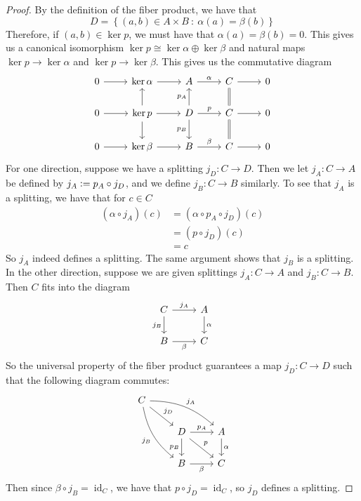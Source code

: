 \documentclass[psamsfonts, 12pt]{amsart}
\theoremstyle{definition}
\theoremstyle{remark}
\newcommand{\set}[1]{\left\lbrace #1 \right\rbrace}
\newcommand{\defeq}{\vcentcolon=}
\DeclareMathOperator{\id}{id}
\begin{document}
\begin{proof}
By the definition of the fiber product, we have that
\[
D = \set{(a,b) \in A \times B ~:~ \alpha(a) = \beta(b)}
\]
Therefore, if $(a,b) \in \ker p$, we must have that $\alpha(a) = \beta(b) = 0$.
This gives us a canonical isomorphism $\ker p \cong \ker\alpha\oplus\ker\beta$
and natural maps $\ker p \to \ker\alpha$ and $\ker p \to \ker\beta$. This
gives us the commutative diagram
\[\begin{tikzcd}
0 \ar[r] & \ker\alpha \ar[r] & A \ar[r,"\alpha"] & C \ar[d,equal] \ar[r] & 0 \\
0 \ar[r] & \ker p \ar[u]\ar[d]\ar[r] & D \ar[d, "p_B"']\ar[u, "p_A"]\ar[r,"p"]
& C \ar[r] \ar[d, equal] & 0 \\
0 \ar[r] & \ker\beta \ar[r] & B \ar[r,"\beta"] & C \ar[r] & 0
\end{tikzcd}\]
For one direction, suppose we have a splitting $j_D : C \to D$. Then we let
$j_A : C \to A$ be defined by $j_A \defeq p_A\circ j_D$, and we define $j_B : C \to B$
similarly. To see that $j_A$ is a splitting, we have that for $c \in C$
\begin{align*}
(\alpha \circ j_A)(c) &= (\alpha \circ p_A \circ j_D)(c) \\
&= (p \circ j_D)(c) \\
&= c
\end{align*}
So $j_A$ indeed defines a splitting. The same argument shows that $j_B$ is a
splitting. \\

In the other direction, suppose we are given splittings $j_A : C \to A$ and
$j_B : C \to B$. Then $C$ fits into the diagram
\[\begin{tikzcd}
C \ar[r, "j_A" ] \ar[d, "j_B"'] & A \ar[d, "\alpha"]\\
B \ar[r, "\beta"'] & C
\end{tikzcd}\]
So the universal property of the fiber product guarantees a map $j_D : C \to D$
such that the following diagram commutes:
\[\begin{tikzcd}
C \ar[dr, "j_D"] \ar[ddr, "j_B"', bend right=20] \ar[drr, "j_A", bend left=20]\\
& D \ar[r, "p_A" ] \ar[d, "p_B"']\ar[dr, "p"] & A \ar[d, "\alpha"]\\
& B \ar[r, "\beta"'] & C
\end{tikzcd}\]
Then since $\beta \circ j_B = \id_C$, we have that $p \circ j_D = \id_C$, so
$j_D$ defines a splitting.
\end{proof}
%
\end{document}
